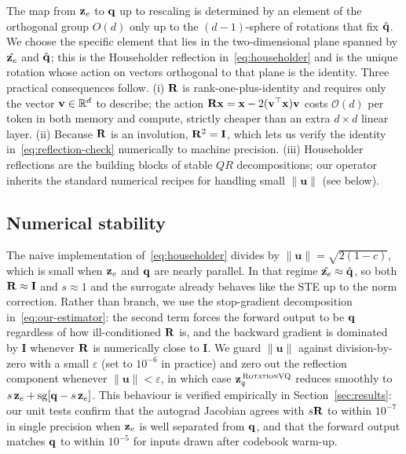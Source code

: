 The map from $\mathbf{z}_e$ to $\mathbf{q}$ up to rescaling is determined by an
element of the orthogonal group $O(d)$ only up to the $(d{-}1)$-sphere
of rotations that fix $\hat{\mathbf{q}}$. We choose the specific element
that lies in the two-dimensional plane spanned by $\hat{\mathbf{z}_e}$ and
$\hat{\mathbf{q}}$; this is the Householder reflection
in~\eqref{eq:householder} and is the unique rotation whose action
on vectors orthogonal to that plane is the identity. Three practical
consequences follow.
(i) $\mathbf{R}$ is rank-one-plus-identity and requires only the vector
$\mathbf{v} \in \mathbb{R}^{d}$ to describe; the action
$\mathbf{R}\mathbf{x} = \mathbf{x} - 2(\mathbf{v}^\top\mathbf{x})\mathbf{v}$ costs
$\mathcal{O}(d)$ per token in both memory and compute, strictly
cheaper than an extra $d \times d$ linear layer.
(ii) Because $\mathbf{R}$ is an involution, $\mathbf{R}^2 = \mathbf{I}$, which
lets us verify the identity in~\eqref{eq:reflection-check} numerically
to machine precision.
(iii) Householder reflections are the building blocks of stable
$QR$ decompositions; our operator inherits the standard numerical
recipes for handling small $\|\mathbf{u}\|$ (see below).

\subsection{Numerical stability}

The naive implementation of~\eqref{eq:householder} divides by
$\|\mathbf{u}\| = \sqrt{2(1-c)}$, which is small when $\mathbf{z}_e$ and
$\mathbf{q}$ are nearly parallel. In that regime $\hat{\mathbf{z}_e} \approx
\hat{\mathbf{q}}$, so both $\mathbf{R} \approx \mathbf{I}$ and $s \approx 1$ and
the surrogate already behaves like the STE up to the norm
correction. Rather than branch, we use the stop-gradient decomposition
in~\eqref{eq:our-estimator}: the second term forces the forward
output to be $\mathbf{q}$ regardless of how ill-conditioned $\mathbf{R}$ is,
and the backward gradient is dominated by $\mathbf{I}$ whenever
$\mathbf{R}$ is numerically close to $\mathbf{I}$. We guard
$\|\mathbf{u}\|$ against division-by-zero with a small
$\varepsilon$ (set to $10^{-6}$ in practice) and zero out the
reflection component whenever $\|\mathbf{u}\| < \varepsilon$, in
which case $\mathbf{z}_q^{\,\textsc{RotationVQ}}$ reduces smoothly to $s\,\mathbf{z}_e + \operatorname{sg}\!\left[\mathbf{q} - s\,\mathbf{z}_e\right]$.
This behaviour is verified empirically in Section~\ref{sec:results}:
our unit tests confirm that the autograd Jacobian agrees with
$s\mathbf{R}$ to within $10^{-7}$ in single precision when $\mathbf{z}_e$ is well
separated from $\mathbf{q}$, and that the forward output matches $\mathbf{q}$ to
within $10^{-5}$ for inputs drawn after codebook warm-up.

